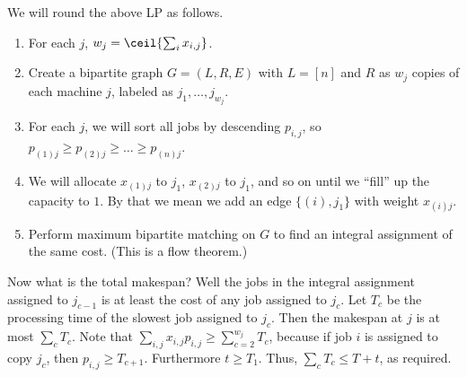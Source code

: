 \begin{algothm}
    We will round the above LP as follows. 
    \begin{enumerate}
    \item For each $j$, $w_j = \ceil{\sum_i x_{i, j}}$. 
    \item Create a bipartite graph $G = (L, R, E)$
    with $L = [n]$ and $R$ as $w_j$ copies of each machine $j$, labeled as $j_{1}, \dots, j_{w_j}$. 
    \item For each $j$, we will sort all jobs by descending $p_{i,j}$, so $p_{(1) j} \ge p_{(2)j} \ge \dots \ge p_{(n) j}$.
    \item We will allocate $x_{(1)j}$ to $j_1$, $x_{(2)j}$ to $j_1$, and so on until
    we ``fill'' up the capacity to $1$. By that we mean we add an edge $\{(i), j_1\}$
    with weight $x_{(i)j}$.
    \item Perform maximum bipartite matching on $G$ to find an integral assignment of the same cost. (This is a flow theorem.)
    \end{enumerate}
    \begin{proof*}
    Now what is the total makespan? Well the jobs in the integral assignment
    assigned to $j_{c - 1}$ is at least the cost of any job assigned to $j_c$.
    Let $T_c$ be the processing time of the slowest job assigned to $j_c$.
    Then the makespan at $j$ is at most $\sum_c T_c$.
    Note that $\sum_{i,j} x_{i,j} p_{i,j} \ge \sum_{c = 2}^{w_{j}} T_c$, because if
    job $i$ is assigned to copy $j_c$,
    then $p_{i,j} \ge T_{c + 1}$. Furthermore $t \ge T_1$. Thus, $\sum_c T_c \le T + t$,
    as required.
    \end{proof*}
\end{algothm}
